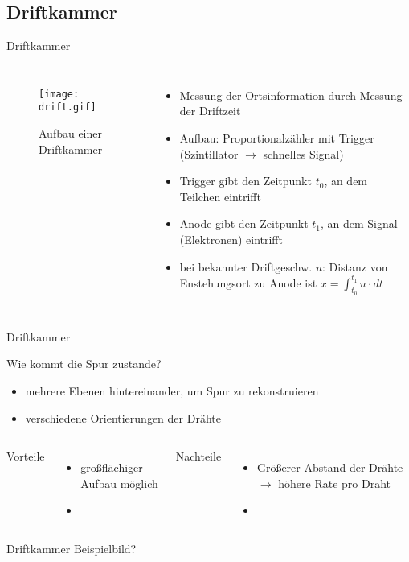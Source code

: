 \subsection[]{Driftkammer}

\begin{frame}{Driftkammer}
    \begin{columns}[T]
			\begin{figure}[htbp]
			  \centering
			  \texttt{[image: drift.gif]}
			  \caption{Aufbau einer Driftkammer}
			\end{figure}
			
	    	\begin{itemize}
	    	  \item Messung der Ortsinformation durch Messung der Driftzeit
			  \item Aufbau: Proportionalzähler mit Trigger (Szintillator $\rightarrow$ schnelles Signal)
			  \item Trigger gibt den Zeitpunkt $t_0$, an dem Teilchen eintrifft
			  \item Anode gibt den Zeitpunkt $t_1$, an dem Signal (Elektronen) eintrifft
			  \item bei bekannter Driftgeschw. $u$: Distanz von Enstehungsort zu Anode ist
			  $x=\int_{t_0}^{t_1}u\cdot dt$
			\end{itemize}
			
    \end{columns}
\end{frame}

\begin{frame}{Driftkammer}

	\begin{block}{Wie kommt die Spur zustande?}
		\begin{itemize}
		  \item mehrere Ebenen hintereinander, um Spur zu rekonstruieren
		  \item verschiedene Orientierungen der Drähte
		\end{itemize}
	\end{block}
	\vspace{0.8cm}
    \begin{columns}[T]
			Vorteile		
			\begin{itemize}
			  \item großflächiger Aufbau möglich
			  \item
			\end{itemize}	
	    	Nachteile
	    	\begin{itemize}
			  \item Größerer Abstand der Drähte $\rightarrow$ höhere Rate pro Draht 
			  \item 
			\end{itemize}
    \end{columns}
    \vspace{1cm}
\end{frame}

\begin{frame}{Driftkammer}
    Beispielbild?
\end{frame}